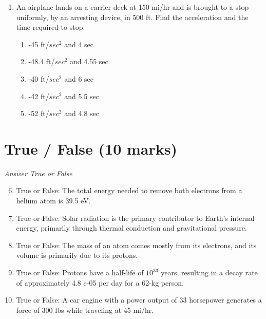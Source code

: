 \documentclass[12pt]{article}
\begin{document}
\begin{enumerate}[label=\arabic*.]
\begin{enumerate}[label=(\alph*)]
    \item 5 kT
    \item (1/4) k T
    \item 3 kT
\end{enumerate}
\item An airplane lands on a carrier deck at 150 mi/hr and is brought to a stop uniformly, by an arresting device, in 500 ft. Find the acceleration and the time required to stop.
\begin{enumerate}[label=(\alph*)]
    \item -45 ft/$sec^2$ and 4 sec
    \item -48.4 ft/$sec^2$ and 4.55 sec
    \item -40 ft/$sec^2$ and 6 sec
    \item -42 ft/$sec^2$ and 5.5 sec
    \item -52 ft/$sec^2$ and 4.8 sec
\end{enumerate}
\end{enumerate}

\section*{True / False (10 marks)}
\textit{Answer True or False}
\begin{enumerate}[label=\arabic*.]
\setcounter{enumi}{5}
\item True or False: The total energy needed to remove both electrons from a helium atom is 39.5 eV.
\item True or False: Solar radiation is the primary contributor to Earth's internal energy, primarily through thermal conduction and gravitational pressure.
\item True or False: The mass of an atom comes mostly from its electrons, and its volume is primarily due to its protons.
\item True or False: Protons have a half-life of $10^33$ years, resulting in a decay rate of approximately 4.8 e-05 per day for a 62-kg person.
\item True or False: A car engine with a power output of 33 horsepower generates a force of 300 lbs while traveling at 45 mi/hr.
\end{enumerate}
\end{document}
